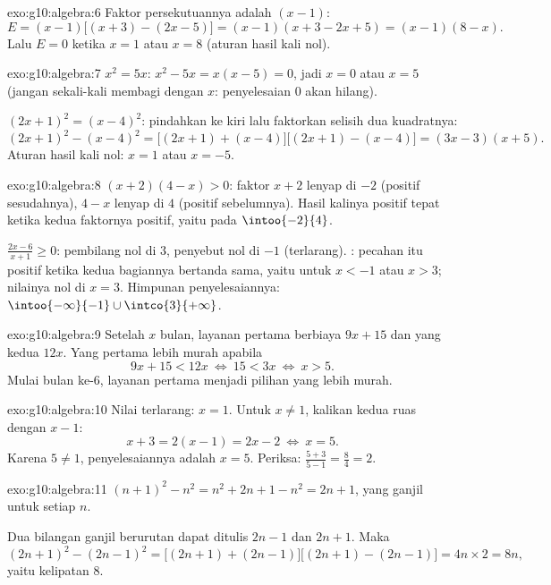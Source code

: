 \begin{solution}{exo:g10:algebra:6}
Faktor persekutuannya adalah $(x-1)$:
\[
E = (x-1)\bigl[(x+3) - (2x - 5)\bigr] = (x-1)(x + 3 - 2x + 5)
= (x-1)(8 - x).
\]
Lalu $E = 0$ ketika $x = 1$ atau $x = 8$ (aturan hasil kali nol).
\end{solution}

\begin{solution}{exo:g10:algebra:7}
$x^2 = 5x$: $x^2 - 5x = x(x - 5) = 0$, jadi $x = 0$ atau $x = 5$ (jangan
sekali-kali membagi dengan $x$: penyelesaian $0$ akan hilang).

$(2x+1)^2 = (x-4)^2$: pindahkan ke kiri lalu faktorkan selisih dua
kuadratnya:
\[
(2x+1)^2 - (x-4)^2
= \bigl[(2x+1) + (x-4)\bigr]\bigl[(2x+1) - (x-4)\bigr]
= (3x - 3)(x + 5).
\]
Aturan hasil kali nol: $x = 1$ atau $x = -5$.
\end{solution}

\begin{solution}{exo:g10:algebra:8}
$(x+2)(4-x) > 0$: faktor $x + 2$ lenyap di $-2$ (positif sesudahnya),
$4 - x$ lenyap di $4$ (positif sebelumnya). Hasil kalinya positif
tepat ketika kedua faktornya positif, yaitu pada $\intoo{-2}{4}$.

$\frac{2x-6}{x+1} \geq 0$: pembilang nol di $3$, penyebut nol di
$-1$ (terlarang). : pecahan itu positif ketika kedua bagiannya
bertanda sama, yaitu untuk $x < -1$ atau $x > 3$; nilainya nol di $x = 3$.
Himpunan penyelesaiannya: $\intoo{-\infty}{-1} \cup \intco{3}{+\infty}$.
\end{solution}

\begin{solution}{exo:g10:algebra:9}
Setelah $x$ bulan, layanan pertama berbiaya $9x + 15$ dan yang kedua $12x$.
Yang pertama lebih murah apabila
\[
9x + 15 < 12x
\ \Longleftrightarrow\
15 < 3x
\ \Longleftrightarrow\
x > 5 .
\]
Mulai bulan ke-$6$, layanan pertama menjadi pilihan yang lebih murah.
\end{solution}

\begin{solution}{exo:g10:algebra:10}
Nilai terlarang: $x = 1$. Untuk $x \neq 1$, kalikan kedua ruas dengan $x - 1$:
\[
x + 3 = 2(x - 1) = 2x - 2
\ \Longleftrightarrow\
x = 5 .
\]
Karena $5 \neq 1$, penyelesaiannya adalah $x = 5$. Periksa:
$\frac{5+3}{5-1} = \frac84 = 2$.
\end{solution}

\begin{solution}{exo:g10:algebra:11}
$(n+1)^2 - n^2 = n^2 + 2n + 1 - n^2 = 2n + 1$, yang ganjil untuk setiap
 $n$.

Dua bilangan ganjil berurutan dapat ditulis $2n - 1$ dan $2n + 1$. Maka
\[
(2n+1)^2 - (2n-1)^2
= \bigl[(2n+1)+(2n-1)\bigr]\bigl[(2n+1)-(2n-1)\bigr]
= 4n \times 2 = 8n,
\]
yaitu kelipatan $8$.
\end{solution}

